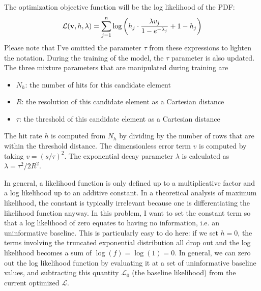 The optimization objective function will be the log likelihood of the PDF:
$$ \mathcal{L}(\mathbf{v}, h, \lambda) = \sum_{j=1}^{n} \log \left( h_j \cdot \frac{\lambda v_j}{1 - e^{-\lambda_j}} + 1 - h_j \right)$$
Please note that I've omitted the parameter $\tau$ from these expressions to lighten the notation.
During the training of the model, the $\tau$ parameter is also updated.
The three mixture parameters that are manipulated during training are 
\begin{itemize}
\item $N_h$: the number of hits for this candidate element
\item $R$: the resolution of this candidate element as a Cartesian distance
\item $\tau$: the threshold of this candidate element as a Cartesian distance
\end{itemize}
The hit rate $h$ is computed from $N_h$ by dividing by the number of rows that are within the threshold distance.
The dimensionless error term $v$ is computed by taking $v = (s/\tau)^2$.
The exponential decay parameter $\lambda$ is calculated as $\lambda = \tau^2 / 2R^2$.

In general, a likelihood function is only defined up to a multiplicative factor and a log likelihood up to an additive constant.
In a theoretical analysis of maximum likelihood, the constant is typically irrelevant because one is differentiating the likelihood function anyway.
In this problem, I want to set the constant term so that a log likelihood of zero equates to having no information,
i.e. an uninformative baseline.
This is particularly easy to do here: if we set $h=0$, the terms involving the truncated exponential distribution all drop out 
and the log likelihood becomes a sum of $\log(f) = \log(1) = 0$.
In general, we can zero out the log likelihood function by evaluating it at a set of uninformative baseline values, 
and subtracting this quantity $\mathcal{L}_0$ (the baseline likelihood) from the current optimized $\mathcal{L}$.

